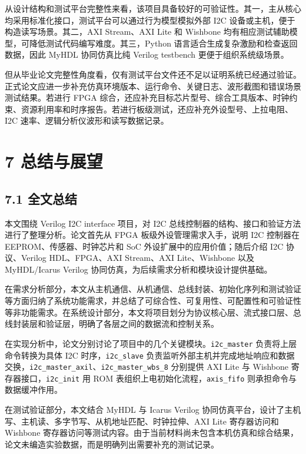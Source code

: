 从设计结构和测试平台完整性来看，该项目具备较好的可验证性。其一，主从核心均采用标准化接口，测试平台可以通过行为模型模拟外部
I2C 设备或主机，便于构造读写场景。其二，AXI Stream、AXI Lite 和 Wishbone
均有相应测试辅助模型，可降低测试代码编写难度。其三，Python
语言适合生成复杂激励和检查返回数据，因此 MyHDL 协同仿真比纯 Verilog
testbench 更便于组织系统级场景。

但从毕业论文完整性角度看，仅有测试平台文件还不足以证明系统已经通过验证。正式论文应进一步补充仿真环境版本、运行命令、关键日志、波形截图和错误场景测试结果。若进行
FPGA
综合，还应补充目标芯片型号、综合工具版本、时钟约束、资源利用率和时序报告。若进行板级测试，还应补充外设型号、上拉电阻、I2C
速率、逻辑分析仪波形和读写数据记录。

\section{7 总结与展望}\label{ux603bux7ed3ux4e0eux5c55ux671b}

\subsection{7.1 全文总结}\label{ux5168ux6587ux603bux7ed3}

本文围绕 Verilog I2C interface 项目，对 I2C
总线控制器的结构、接口和验证方法进行了整理分析。论文首先从 FPGA
板级外设管理需求入手，说明 I2C 控制器在 EEPROM、传感器、时钟芯片和 SoC
外设扩展中的应用价值；随后介绍 I2C 协议、Verilog HDL、FPGA、AXI
Stream、AXI Lite、Wishbone 以及 MyHDL/Icarus Verilog
协同仿真，为后续需求分析和模块设计提供基础。

在需求分析部分，本文从主机通信、从机通信、总线封装、初始化序列和测试验证等方面归纳了系统功能需求，并总结了可综合性、可复用性、可配置性和可验证性等非功能需求。在系统设计部分，本文将项目划分为协议核心层、流式接口层、总线封装层和验证层，明确了各层之间的数据流和控制关系。

在实现分析中，论文分别讨论了项目中的几个关键模块。\texttt{i2c\_master}
负责将上层命令转换为具体 I2C 时序，\texttt{i2c\_slave}
负责监听外部主机并完成地址响应和数据交换，\texttt{i2c\_master\_axil}、\texttt{i2c\_master\_wbs\_8}
分别提供 AXI Lite 与 Wishbone 寄存器接口，\texttt{i2c\_init} 用 ROM
表组织上电初始化流程，\texttt{axis\_fifo} 则承担命令与数据缓冲作用。

在测试验证部分，本文结合 MyHDL 与 Icarus Verilog
协同仿真平台，设计了主机写、主机读、多字节写、从机地址匹配、时钟拉伸、AXI
Lite 寄存器访问和 Wishbone
寄存器访问等测试内容。由于当前材料尚未包含本机仿真和综合结果，论文未编造实验数据，而是明确列出需要补充的测试记录。

